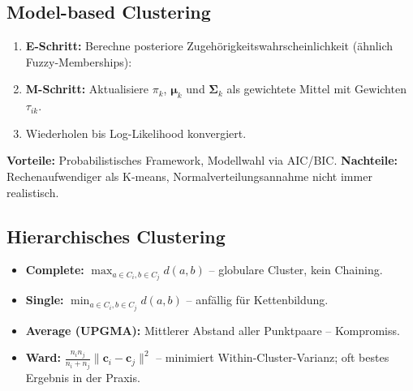 \subsection{Model-based Clustering}


\begin{enumerate}[leftmargin=2em]
    \item \textbf{E-Schritt:} Berechne posteriore Zugehörigkeitswahrscheinlichkeit (ähnlich Fuzzy-Memberships):
    \item \textbf{M-Schritt:} Aktualisiere $\pi_k$, $\boldsymbol{\mu}_k$ und $\boldsymbol{\Sigma}_k$ als gewichtete Mittel mit Gewichten $\tau_{ik}$.
    \item Wiederholen bis Log-Likelihood konvergiert.
\end{enumerate}
\textbf{Vorteile:} Probabilistisches Framework, Modellwahl via AIC/BIC. \textbf{Nachteile:} Rechenaufwendiger als K-means, Normalverteilungsannahme nicht immer realistisch.

\newpage

\subsection{Hierarchisches Clustering}


\begin{itemize}[leftmargin=1.5em]
    \item \textbf{Complete:} $\max_{a \in C_i, b \in C_j} d(a,b)$ -- globulare Cluster, kein Chaining.
    \item \textbf{Single:} $\min_{a \in C_i, b \in C_j} d(a,b)$ -- anfällig für Kettenbildung.
    \item \textbf{Average (UPGMA):} Mittlerer Abstand aller Punktpaare -- Kompromiss.
    \item \textbf{Ward:} $\frac{n_i n_j}{n_i+n_j}\|\mathbf{c}_i - \mathbf{c}_j\|^2$ -- minimiert Within-Cluster-Varianz; oft bestes Ergebnis in der Praxis.
\end{itemize}

